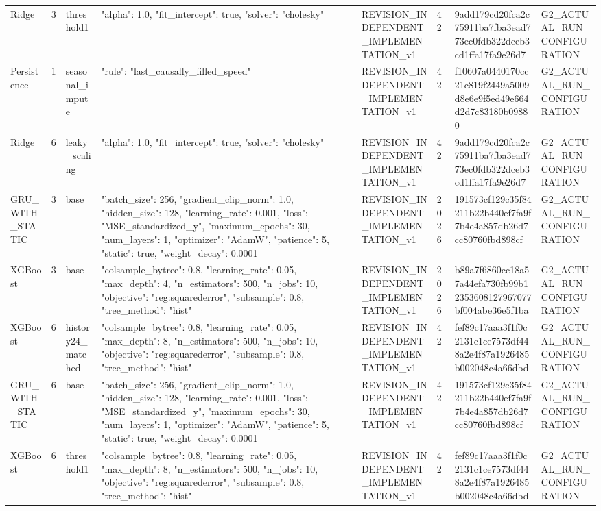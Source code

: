 \begin{longtable}{llllllll}
Ridge & 3 & threshold1 & {"alpha": 1.0, "fit\_intercept": true, "solver": "cholesky"} & REVISION\_INDEPENDENT\_IMPLEMENTATION\_v1 & 42 & 9add179cd20fca2c75911ba7fba3ead773ec0fdb322dceb3cd1ffa17fa9e26d7 & G2\_ACTUAL\_RUN\_CONFIGURATION \\
Persistence & 1 & seasonal\_impute & {"rule": "last\_causally\_filled\_speed"} & REVISION\_INDEPENDENT\_IMPLEMENTATION\_v1 & 42 & f10607a0440170cc21c819f2449a5009d8e6e9f5ed49e664d2d7c83180b09880 & G2\_ACTUAL\_RUN\_CONFIGURATION \\
Ridge & 6 & leaky\_scaling & {"alpha": 1.0, "fit\_intercept": true, "solver": "cholesky"} & REVISION\_INDEPENDENT\_IMPLEMENTATION\_v1 & 42 & 9add179cd20fca2c75911ba7fba3ead773ec0fdb322dceb3cd1ffa17fa9e26d7 & G2\_ACTUAL\_RUN\_CONFIGURATION \\
GRU\_WITH\_STATIC & 3 & base & {"batch\_size": 256, "gradient\_clip\_norm": 1.0, "hidden\_size": 128, "learning\_rate": 0.001, "loss": "MSE\_standardized\_y", "maximum\_epochs": 30, "num\_layers": 1, "optimizer": "AdamW", "patience": 5, "static": true, "weight\_decay": 0.0001} & REVISION\_INDEPENDENT\_IMPLEMENTATION\_v1 & 2026 & 191573cf129c35f84211b22b440ef7fa9f7b4e4a857db26d7cc80760fbd898cf & G2\_ACTUAL\_RUN\_CONFIGURATION \\
XGBoost & 3 & base & {"colsample\_bytree": 0.8, "learning\_rate": 0.05, "max\_depth": 4, "n\_estimators": 500, "n\_jobs": 10, "objective": "reg:squarederror", "subsample": 0.8, "tree\_method": "hist"} & REVISION\_INDEPENDENT\_IMPLEMENTATION\_v1 & 2026 & b89a7f6860cc18a57a44efa730fb99b12353608127967077bf004abe36e5f1ba & G2\_ACTUAL\_RUN\_CONFIGURATION \\
XGBoost & 6 & history24\_matched & {"colsample\_bytree": 0.8, "learning\_rate": 0.05, "max\_depth": 8, "n\_estimators": 500, "n\_jobs": 10, "objective": "reg:squarederror", "subsample": 0.8, "tree\_method": "hist"} & REVISION\_INDEPENDENT\_IMPLEMENTATION\_v1 & 42 & fef89c17aaa3f1f0c2131c1ce7573df448a2e4f87a1926485b002048c4a66dbd & G2\_ACTUAL\_RUN\_CONFIGURATION \\
GRU\_WITH\_STATIC & 6 & base & {"batch\_size": 256, "gradient\_clip\_norm": 1.0, "hidden\_size": 128, "learning\_rate": 0.001, "loss": "MSE\_standardized\_y", "maximum\_epochs": 30, "num\_layers": 1, "optimizer": "AdamW", "patience": 5, "static": true, "weight\_decay": 0.0001} & REVISION\_INDEPENDENT\_IMPLEMENTATION\_v1 & 42 & 191573cf129c35f84211b22b440ef7fa9f7b4e4a857db26d7cc80760fbd898cf & G2\_ACTUAL\_RUN\_CONFIGURATION \\
XGBoost & 6 & threshold1 & {"colsample\_bytree": 0.8, "learning\_rate": 0.05, "max\_depth": 8, "n\_estimators": 500, "n\_jobs": 10, "objective": "reg:squarederror", "subsample": 0.8, "tree\_method": "hist"} & REVISION\_INDEPENDENT\_IMPLEMENTATION\_v1 & 42 & fef89c17aaa3f1f0c2131c1ce7573df448a2e4f87a1926485b002048c4a66dbd & G2\_ACTUAL\_RUN\_CONFIGURATION \\

\end{longtable}
